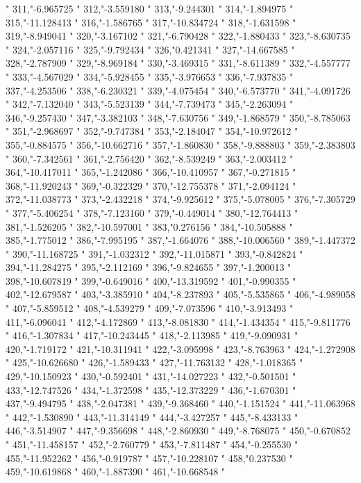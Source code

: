 "
311,"-6.965725
"
312,"-3.559180
"
313,"-9.244301
"
314,"-1.894975
"
315,"-11.128413
"
316,"-1.586765
"
317,"-10.834724
"
318,"-1.631598
"
319,"-8.949041
"
320,"-3.167102
"
321,"-6.790428
"
322,"-1.880433
"
323,"-8.630735
"
324,"-2.057116
"
325,"-9.792434
"
326,"0.421341
"
327,"-14.667585
"
328,"-2.787909
"
329,"-8.969184
"
330,"-3.469315
"
331,"-8.611389
"
332,"-4.557777
"
333,"-4.567029
"
334,"-5.928455
"
335,"-3.976653
"
336,"-7.937835
"
337,"-4.253506
"
338,"-6.230321
"
339,"-4.075454
"
340,"-6.573770
"
341,"-4.091726
"
342,"-7.132040
"
343,"-5.523139
"
344,"-7.739473
"
345,"-2.263094
"
346,"-9.257430
"
347,"-3.382103
"
348,"-7.630756
"
349,"-1.868579
"
350,"-8.785063
"
351,"-2.968697
"
352,"-9.747384
"
353,"-2.184047
"
354,"-10.972612
"
355,"-0.884575
"
356,"-10.662716
"
357,"-1.860830
"
358,"-9.888803
"
359,"-2.383803
"
360,"-7.342561
"
361,"-2.756420
"
362,"-8.539249
"
363,"-2.003412
"
364,"-10.417011
"
365,"-1.242086
"
366,"-10.410957
"
367,"-0.271815
"
368,"-11.920243
"
369,"-0.322329
"
370,"-12.755378
"
371,"-2.094124
"
372,"-11.038773
"
373,"-2.432218
"
374,"-9.925612
"
375,"-5.078005
"
376,"-7.305729
"
377,"-5.406254
"
378,"-7.123160
"
379,"-0.449014
"
380,"-12.764413
"
381,"-1.526205
"
382,"-10.597001
"
383,"0.276156
"
384,"-10.505888
"
385,"-1.775012
"
386,"-7.995195
"
387,"-1.664076
"
388,"-10.006560
"
389,"-1.447372
"
390,"-11.168725
"
391,"-1.032312
"
392,"-11.015871
"
393,"-0.842824
"
394,"-11.284275
"
395,"-2.112169
"
396,"-9.824655
"
397,"-1.200013
"
398,"-10.607819
"
399,"-0.649016
"
400,"-13.319592
"
401,"-0.990355
"
402,"-12.679587
"
403,"-3.385910
"
404,"-8.237893
"
405,"-5.535865
"
406,"-4.989058
"
407,"-5.859512
"
408,"-4.539279
"
409,"-7.073596
"
410,"-3.913493
"
411,"-6.096041
"
412,"-4.172869
"
413,"-8.081830
"
414,"-1.434354
"
415,"-9.811776
"
416,"-1.307834
"
417,"-10.243445
"
418,"-2.113985
"
419,"-9.090931
"
420,"-1.719172
"
421,"-10.311941
"
422,"-3.095998
"
423,"-8.763963
"
424,"-1.272908
"
425,"-10.626680
"
426,"-1.589433
"
427,"-11.763132
"
428,"-1.018365
"
429,"-10.150923
"
430,"-0.592401
"
431,"-14.027223
"
432,"-0.501501
"
433,"-12.747526
"
434,"-1.372598
"
435,"-12.373229
"
436,"-1.670301
"
437,"-9.494795
"
438,"-2.047381
"
439,"-9.368460
"
440,"-1.151524
"
441,"-11.063968
"
442,"-1.530890
"
443,"-11.314149
"
444,"-3.427257
"
445,"-8.433133
"
446,"-3.514907
"
447,"-9.356698
"
448,"-2.860930
"
449,"-8.768075
"
450,"-0.670852
"
451,"-11.458157
"
452,"-2.760779
"
453,"-7.811487
"
454,"-0.255530
"
455,"-11.952262
"
456,"-0.919787
"
457,"-10.228107
"
458,"0.237530
"
459,"-10.619868
"
460,"-1.887390
"
461,"-10.668548
"
